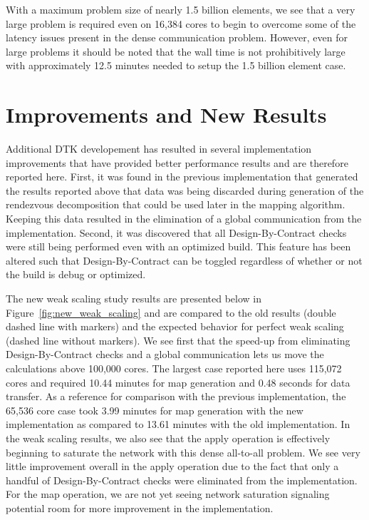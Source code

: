 \documentclass[note]{TechNote}
\begin{document}
With a maximum problem size of nearly 1.5 billion elements, we see
that a very large problem is required even on 16,384 cores to begin to
overcome some of the latency issues present in the dense communication
problem. However, even for large problems it should be noted that the
wall time is not prohibitively large with approximately 12.5 minutes
needed to setup the 1.5 billion element case. 

\section{Improvements and New Results}
Additional DTK developement has resulted in several implementation
improvements that have provided better performance results and are
therefore reported here. First, it was found in the previous
implementation that generated the results reported above that data was
being discarded during generation of the rendezvous decomposition that
could be used later in the mapping algorithm. Keeping this data
resulted in the elimination of a global communication from the
implementation. Second, it was discovered that all Design-By-Contract
checks were still being performed even with an optimized build. This
feature has been altered such that Design-By-Contract can be toggled
regardless of whether or not the build is debug or optimized.

The new weak scaling study results are presented below in
Figure~\ref{fig:new_weak_scaling} and are compared to the old results
(double dashed line with markers) and the expected behavior for
perfect weak scaling (dashed line without markers). We see first that
the speed-up from eliminating Design-By-Contract checks and a global
communication lets us move the calculations above 100,000 cores. The
largest case reported here uses 115,072 cores and required 10.44
minutes for map generation and 0.48 seconds for data transfer. As a
reference for comparison with the previous implementation, the 65,536
core case took 3.99 minutes for map generation with the new
implementation as compared to 13.61 minutes with the old
implementation. In the weak scaling results, we also see that the
apply operation is effectively beginning to saturate the network with
this dense all-to-all problem. We see very little improvement overall
in the apply operation due to the fact that only a handful of
Design-By-Contract checks were eliminated from the implementation. For
the map operation, we are not yet seeing network saturation signaling
potential room for more improvement in the implementation.
\end{document}
